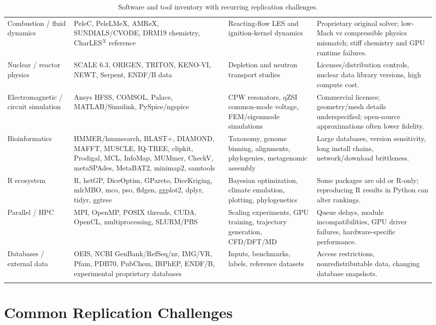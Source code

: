\documentclass[11pt,letterpaper]{article}
\begin{document}
\begin{longtable}{p{3.2cm}p{4.2cm}p{5.1cm}p{4.0cm}}
\addlinespace
Combustion / fluid dynamics & PeleC, PeleLMeX, AMReX, SUNDIALS/CVODE, DRM19 chemistry, CharLES$^X$ reference & Reacting-flow LES and ignition-kernel dynamics & Proprietary original solver; low-Mach vs compressible physics mismatch; stiff chemistry and GPU runtime failures. \\
\addlinespace
Nuclear / reactor physics & SCALE 6.3, ORIGEN, TRITON, KENO-VI, NEWT, Serpent, ENDF/B data & Depletion and neutron transport studies & Licenses/distribution controls, nuclear data library versions, high compute cost. \\
\addlinespace
Electromagnetic / circuit simulation & Ansys HFSS, COMSOL, Palace, MATLAB/Simulink, PySpice/ngspice & CPW resonators, qZSI common-mode voltage, FEM/eigenmode simulations & Commercial licenses; geometry/mesh details underspecified; open-source approximations often lower fidelity. \\
\addlinespace
Bioinformatics & HMMER/hmmsearch, BLAST+, DIAMOND, MAFFT, MUSCLE, IQ-TREE, clipkit, Prodigal, MCL, InfoMap, MUMmer, CheckV, metaSPAdes, MetaBAT2, minimap2, samtools & Taxonomy, genome binning, alignments, phylogenies, metagenomic assembly & Large databases, version sensitivity, long install chains, network/download brittleness. \\
\addlinespace
R ecosystem & R, hetGP, DiceOptim, GPareto, DiceKriging, mlrMBO, mco, pso, fldgen, ggplot2, dplyr, tidyr, ggtree & Bayesian optimization, climate emulation, plotting, phylogenetics & Some packages are old or R-only; reproducing R results in Python can alter rankings. \\
\addlinespace
Parallel / HPC & MPI, OpenMP, POSIX threads, CUDA, OpenCL, multiprocessing, SLURM/PBS & Scaling experiments, GPU training, trajectory generation, CFD/DFT/MD & Queue delays, module incompatibilities, GPU driver failures, hardware-specific performance. \\
\addlinespace
Databases / external data & OEIS, NCBI GenBank/RefSeq/nr, IMG/VR, Pfam, PDB70, PubChem, IRPhEP, ENDF/B, experimental proprietary databases & Inputs, benchmarks, labels, reference datasets & Access restrictions, nonredistributable data, changing database snapshots. \\
\bottomrule
\caption{Software and tool inventory with recurring replication challenges.}
\end{longtable}

\section{Common Replication Challenges}
\end{document}
